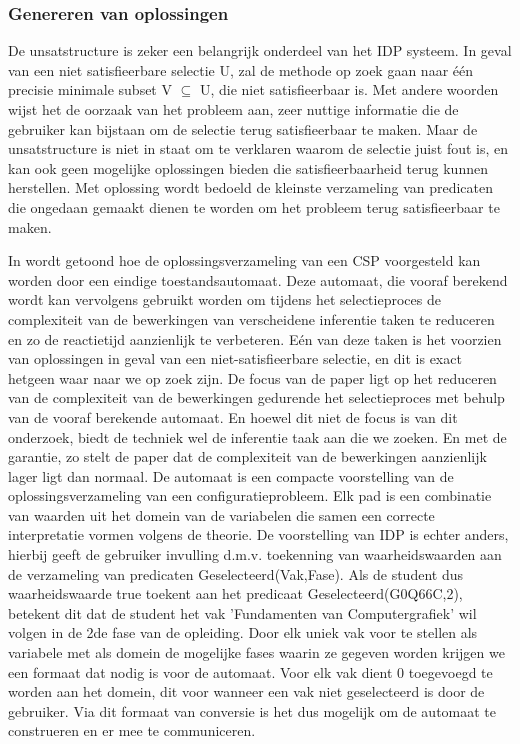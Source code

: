 \subsubsection{Genereren van oplossingen}
De unsatstructure is zeker een belangrijk onderdeel van het IDP systeem. In geval van een niet satisfieerbare selectie U, zal de methode op zoek gaan naar \'{e}\'{e}n precisie minimale subset V $\subseteq$ U, die niet satisfieerbaar is. Met andere woorden wijst het de oorzaak van het probleem aan, zeer nuttige informatie die de gebruiker kan bijstaan om de selectie terug satisfieerbaar te maken. Maar de unsatstructure is niet in staat om te verklaren waarom de selectie juist fout is, en kan ook geen mogelijke oplossingen bieden die satisfieerbaarheid terug kunnen herstellen. Met oplossing wordt bedoeld de kleinste verzameling van predicaten die ongedaan gemaakt dienen te worden om het probleem terug satisfieerbaar te maken. 

In \citep{amilhastre2002consistency} wordt getoond hoe de oplossingsverzameling van een CSP voorgesteld kan worden door een eindige toestandsautomaat. Deze automaat, die vooraf berekend wordt kan vervolgens gebruikt worden om tijdens het selectieproces de complexiteit van de bewerkingen van verscheidene inferentie taken te reduceren en zo de reactietijd aanzienlijk te verbeteren. E\'{e}n van deze taken is het voorzien van oplossingen in geval van een niet-satisfieerbare selectie, en dit is exact hetgeen waar naar we op zoek zijn. De focus van de paper ligt op het reduceren van de complexiteit van de bewerkingen gedurende het selectieproces met behulp van de vooraf berekende automaat. En hoewel dit niet de focus is van dit onderzoek, biedt de techniek wel de inferentie taak aan die we zoeken. En met de garantie, zo stelt de paper dat de complexiteit van de bewerkingen aanzienlijk lager ligt dan normaal. De automaat is een compacte voorstelling van de oplossingsverzameling van een configuratieprobleem. Elk pad is een combinatie van waarden uit het domein van de variabelen die samen een correcte interpretatie vormen volgens de theorie. De voorstelling van IDP is echter anders, hierbij geeft de gebruiker invulling d.m.v. toekenning van waarheidswaarden aan de verzameling van predicaten Geselecteerd(Vak,Fase). Als de student dus waarheidswaarde true toekent aan het predicaat Geselecteerd(G0Q66C,2), betekent dit dat de student het vak 'Fundamenten van Computergrafiek' wil volgen in de 2de fase van de opleiding. Door elk uniek vak voor te stellen als variabele met als domein de mogelijke fases waarin ze gegeven worden krijgen we een formaat dat nodig is voor de automaat. Voor elk vak dient 0 toegevoegd te worden aan het domein, dit voor wanneer een vak niet geselecteerd is door de gebruiker. Via dit formaat van conversie is het dus mogelijk om de automaat te construeren en er mee te communiceren.

